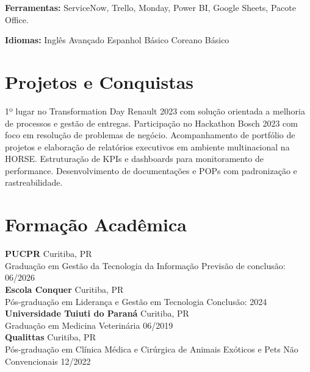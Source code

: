 \documentclass[11pt,a4paper]{article}
\begin{document}
\textbf{Ferramentas:} ServiceNow, Trello, Monday, Power BI, Google Sheets, Pacote Office.

\textbf{Idiomas:} Inglês Avançado \enspace\textbullet\enspace Espanhol Básico \enspace\textbullet\enspace Coreano Básico

\section{Projetos e Conquistas}

1º lugar no Transformation Day Renault 2023 com solução orientada a melhoria de processos e gestão de entregas. Participação no Hackathon Bosch 2023 com foco em resolução de problemas de negócio. Acompanhamento de portfólio de projetos e elaboração de relatórios executivos em ambiente multinacional na HORSE. Estruturação de KPIs e dashboards para monitoramento de performance. Desenvolvimento de documentações e POPs com padronização e rastreabilidade.

\section{Formação Acadêmica}

\textbf{PUCPR} \hfill Curitiba, PR\\
Graduação em Gestão da Tecnologia da Informação \hfill Previsão de conclusão: 06/2026\\[6pt]

\textbf{Escola Conquer} \hfill Curitiba, PR\\
Pós-graduação em Liderança e Gestão em Tecnologia \hfill Conclusão: 2024\\[6pt]

\textbf{Universidade Tuiuti do Paraná} \hfill Curitiba, PR\\
Graduação em Medicina Veterinária \hfill 06/2019\\[6pt]

\textbf{Qualittas} \hfill Curitiba, PR\\
Pós-graduação em Clínica Médica e Cirúrgica de Animais Exóticos e Pets Não Convencionais \hfill 12/2022
\end{document}
